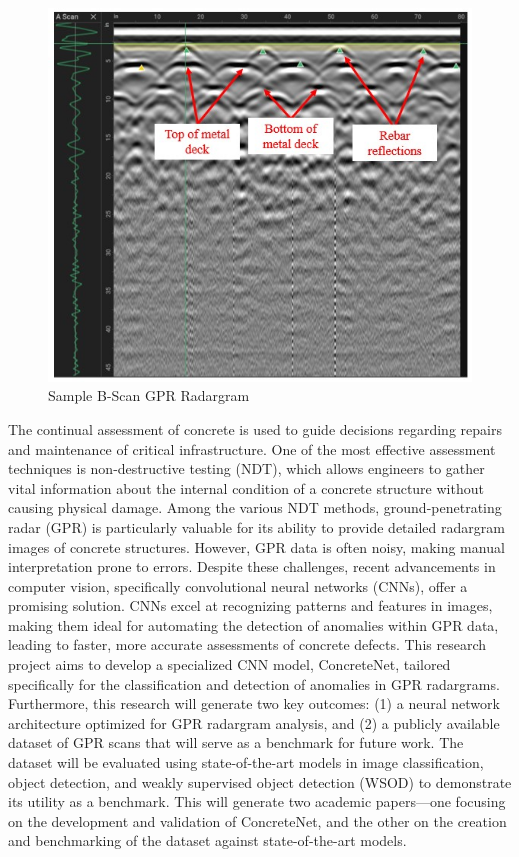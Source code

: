 \documentclass[pra, superscriptaddress]{revtex4-2}
\begin{document}
\begin{figure}
    \vspace{-1.3em} %
    \centering
    \includegraphics[width=\linewidth]{img/Figure1.jpg}
    \caption{Sample B-Scan GPR Radargram}
    \label{fig:gpr-radargram}
\end{figure}

\noindent The continual assessment of concrete is used to guide decisions regarding repairs and maintenance of critical infrastructure. One of the most effective assessment techniques is non-destructive testing (NDT), which allows engineers to gather vital information about the internal condition of a concrete structure without causing physical damage. Among the various NDT methods, ground-penetrating radar (GPR) is particularly valuable for its ability to provide detailed radargram images of concrete structures. However, GPR data is often noisy, making manual interpretation prone to errors. Despite these challenges, recent advancements in computer vision, specifically convolutional neural networks (CNNs), offer a promising solution. CNNs excel at recognizing patterns and features in images, making them ideal for automating the detection of anomalies within GPR data, leading to faster, more accurate assessments of concrete defects. This research project aims to develop a specialized CNN model, ConcreteNet, tailored specifically for the classification and detection of anomalies in GPR radargrams. Furthermore, this research will generate two key outcomes: (1) a neural network architecture optimized for GPR radargram analysis, and (2) a publicly available dataset of GPR scans that will serve as a benchmark for future work. The dataset will be evaluated using state-of-the-art models in image classification, object detection, and weakly supervised object detection (WSOD) to demonstrate its utility as a benchmark. This will generate two academic papers---one focusing on the development and validation of ConcreteNet, and the other on the creation and benchmarking of the dataset against state-of-the-art models.
\end{document}
